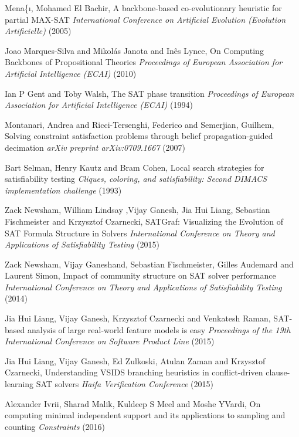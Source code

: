 	Mena{\{\i}, Mohamed El Bachir,
        A backbone-based co-evolutionary heuristic for partial MAX-{SAT}
		\textit{International Conference on Artificial Evolution (Evolution Artificielle)}
        (2005)

	Joao Marques-Silva and Mikol{\'a}s Janota and In{\^e}s Lynce,
        On Computing Backbones of Propositional Theories
		\textit{Proceedings of European Association for Artificial Intelligence ({ECAI})}
        (2010)

	Ian P Gent and Toby Walsh,
        The {SAT} phase transition
		\textit{Proceedings of European Association for Artificial Intelligence ({ECAI})}
        (1994)

	Montanari, Andrea and Ricci-Tersenghi, Federico and Semerjian, Guilhem,
        Solving constraint satisfaction problems through belief propagation-guided decimation
		\textit{arXiv preprint arXiv:0709.1667}
        (2007)		

 Bart Selman, Henry Kautz and Bram Cohen,
  Local search strategies for satisfiability testing
  \textit{Cliques, coloring, and satisfiability: Second DIMACS implementation challenge}
  (1993)

  Zack Newsham, William Lindsay ,Vijay Ganesh, Jia Hui Liang, Sebastian Fischmeister and Krzysztof Czarnecki,
  {SATGraf}: Visualizing the Evolution of {SAT} Formula Structure in Solvers
  \textit{International Conference on Theory and Applications of Satisfiability Testing}
  (2015)

Zack Newsham, Vijay Ganeshand, Sebastian Fischmeister, Gilles Audemard and Laurent Simon,
Impact of community structure on {SAT} solver performance
\textit{International Conference on Theory and Applications of Satisfiability Testing}
(2014)

  Jia Hui Liang, Vijay Ganesh, Krzysztof Czarnecki and Venkatesh Raman,
  {SAT}-based analysis of large real-world feature models is easy
  \textit{Proceedings of the 19th International Conference on Software Product Line}
  (2015)


   Jia Hui Liang, Vijay Ganesh, Ed Zulkoski, Atulan Zaman and Krzysztof Czarnecki,
  Understanding VSIDS branching heuristics in conflict-driven clause-learning {SAT} solvers
  \textit{Haifa Verification Conference}
  (2015)

  Alexander Ivrii, Sharad Malik, Kuldeep S Meel and Moshe YVardi,
  On computing minimal independent support and its applications to sampling and counting
  \textit{Constraints}
  (2016)

